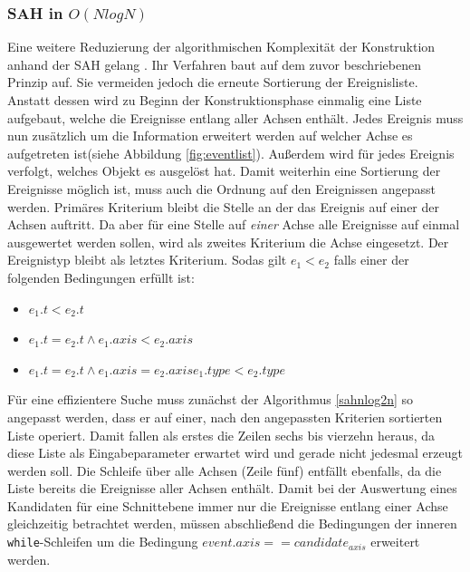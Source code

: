 \subsubsection{SAH in $O(N {log} N)$}
\label{sec:nlogn}
Eine weitere Reduzierung der algorithmischen Komplexität der Konstruktion anhand der SAH gelang \cite{WaldHavran06}. Ihr Verfahren baut auf dem zuvor beschriebenen Prinzip auf. Sie vermeiden jedoch die erneute Sortierung der Ereignisliste. Anstatt dessen wird zu Beginn der Konstruktionsphase einmalig eine Liste aufgebaut, welche die Ereignisse entlang aller Achsen enthält. Jedes Ereignis muss nun zusätzlich um die Information erweitert werden auf welcher Achse es aufgetreten ist(siehe Abbildung \ref{fig:eventlist}). Außerdem wird für jedes Ereignis verfolgt, welches Objekt es ausgelöst hat.
Damit weiterhin eine Sortierung der Ereignisse möglich ist, muss auch die Ordnung auf den Ereignissen angepasst werden. Primäres Kriterium bleibt die Stelle an der das Ereignis auf einer der Achsen auftritt. Da aber für eine Stelle auf \emph{einer} Achse alle Ereignisse auf einmal ausgewertet werden sollen, wird als zweites Kriterium die Achse eingesetzt. Der Ereignistyp bleibt als letztes Kriterium. Sodas gilt $e_1 < e_2$ falls einer der folgenden Bedingungen erfüllt ist:
\begin{itemize}
 \item $e_1.t < e_2.t$
 \item $e_1.t = e_2.t \land e_1.axis < e_2.axis$
 \item $e_1.t = e_2.t \land e_1.axis = e_2.axis e_1.type < e_2.type$
\end{itemize}
Für eine effizientere Suche muss zunächst der Algorithmus \ref{sahnlog2n} so angepasst werden, dass er auf einer, nach den angepassten Kriterien sortierten Liste operiert. Damit fallen als erstes die Zeilen sechs bis vierzehn heraus, da diese Liste als Eingabeparameter erwartet wird und gerade nicht jedesmal erzeugt werden soll. Die Schleife über alle Achsen (Zeile fünf) entfällt ebenfalls, da die Liste bereits die Ereignisse aller Achsen enthält.
Damit bei der Auswertung eines Kandidaten für eine Schnittebene immer nur die Ereignisse entlang einer Achse gleichzeitig betrachtet werden, müssen abschließend die Bedingungen der inneren \verb|while|-Schleifen um die Bedingung $event.axis == candidate_{axis}$ erweitert werden.

